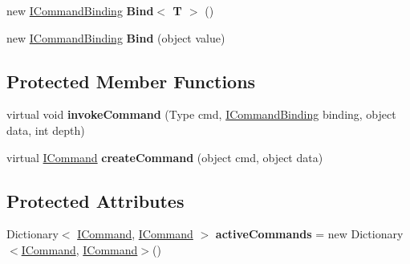 \begin{DoxyCompactItemize}
\item 
\hypertarget{classbabel_1_1extensions_1_1command_1_1impl_1_1_command_binder_a0b332603307578e797d407434be99c1e}{new \hyperlink{interfacebabel_1_1extensions_1_1command_1_1api_1_1_i_command_binding}{I\-Command\-Binding} {\bfseries Bind$<$ T $>$} ()}\label{classbabel_1_1extensions_1_1command_1_1impl_1_1_command_binder_a0b332603307578e797d407434be99c1e}

\item 
\hypertarget{classbabel_1_1extensions_1_1command_1_1impl_1_1_command_binder_a2663eb8285249630cf16d835a9cc6720}{new \hyperlink{interfacebabel_1_1extensions_1_1command_1_1api_1_1_i_command_binding}{I\-Command\-Binding} {\bfseries Bind} (object value)}\label{classbabel_1_1extensions_1_1command_1_1impl_1_1_command_binder_a2663eb8285249630cf16d835a9cc6720}

\end{DoxyCompactItemize}
\subsection*{Protected Member Functions}
\begin{DoxyCompactItemize}
\item 
\hypertarget{classbabel_1_1extensions_1_1command_1_1impl_1_1_command_binder_a000a53453bcd9e119e3d24a73f60383f}{virtual void {\bfseries invoke\-Command} (Type cmd, \hyperlink{interfacebabel_1_1extensions_1_1command_1_1api_1_1_i_command_binding}{I\-Command\-Binding} binding, object data, int depth)}\label{classbabel_1_1extensions_1_1command_1_1impl_1_1_command_binder_a000a53453bcd9e119e3d24a73f60383f}

\item 
\hypertarget{classbabel_1_1extensions_1_1command_1_1impl_1_1_command_binder_a7776192269f851a72ef26a4ffee2c03b}{virtual \hyperlink{interfacebabel_1_1extensions_1_1command_1_1api_1_1_i_command}{I\-Command} {\bfseries create\-Command} (object cmd, object data)}\label{classbabel_1_1extensions_1_1command_1_1impl_1_1_command_binder_a7776192269f851a72ef26a4ffee2c03b}

\end{DoxyCompactItemize}
\subsection*{Protected Attributes}
\begin{DoxyCompactItemize}
\item 
\hypertarget{classbabel_1_1extensions_1_1command_1_1impl_1_1_command_binder_af97f8495f075cb96ff71c0a6db7dfb27}{Dictionary$<$ \hyperlink{interfacebabel_1_1extensions_1_1command_1_1api_1_1_i_command}{I\-Command}, \hyperlink{interfacebabel_1_1extensions_1_1command_1_1api_1_1_i_command}{I\-Command} $>$ {\bfseries active\-Commands} = new Dictionary$<$\hyperlink{interfacebabel_1_1extensions_1_1command_1_1api_1_1_i_command}{I\-Command}, \hyperlink{interfacebabel_1_1extensions_1_1command_1_1api_1_1_i_command}{I\-Command}$>$()}\label{classbabel_1_1extensions_1_1command_1_1impl_1_1_command_binder_af97f8495f075cb96ff71c0a6db7dfb27}

\end{DoxyCompactItemize}
